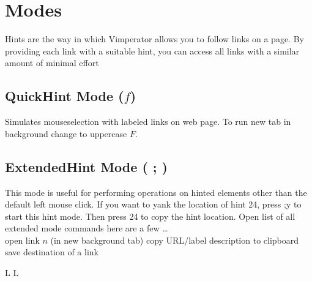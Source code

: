\section{Modes}{Hints are the way in which Vimperator allows you to follow links on a page. By
    providing each link with a suitable hint, you can access all links with a
        similar amount of minimal effort }
        \subsection{QuickHint Mode ($f$)}{Simulates mouseselection with labeled
            links on web page. To run new tab in background change to uppercase $F$.}
            \subsection{ExtendedHint Mode ( ; )}{This mode is useful for
                performing operations on hinted elements other than the default
                    left mouse click. If you want to yank the location of hint 24, press ;y to start this hint
                    mode. Then press 24 to copy the hint location.}
                    	{Open list of all extended mode commands}
                    here are a few \ldots\\
                        	{open link $n$ (in new background tab)}
                        	{copy URL/label description to clipboard}
                        	{save destination of a link}

\copyrightnotice

\vfil
\supereject
\if L\lr \else\null\vfill\eject\fi
\if L\lr \else\null\vfill\eject\fi
\bye

